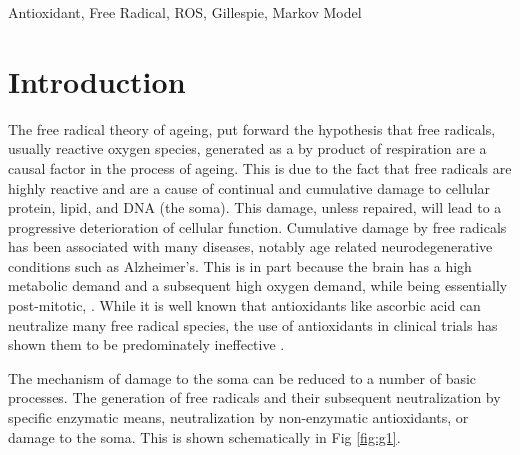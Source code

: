 \documentclass[preprint,12pt,authoryear]{elsarticle}
\begin{document}
\begin{frontmatter}
\begin{abstract}
\end{abstract}

\begin{keyword}
Antioxidant, Free Radical, ROS, Gillespie, Markov Model



\end{keyword}

\end{frontmatter}


\section{Introduction}
\label{}

The free radical theory of ageing, \citet{Harman:1956wu} put forward the hypothesis that
free radicals, usually reactive oxygen species, generated as a by product of respiration are a causal
factor in the process of ageing. This is due to the fact that free radicals are highly reactive
and are a cause of continual and cumulative damage to cellular protein, lipid, and
DNA (the soma). This damage, unless repaired, will lead to a progressive
deterioration of cellular function. Cumulative damage by free radicals has been associated
with many diseases, notably age related neurodegenerative conditions such as
Alzheimer's. This is in part because the brain has a high metabolic demand and a
subsequent high oxygen demand, while being essentially post-mitotic, \citet{Cobley:2018kt}.  
While it is well known that antioxidants like ascorbic acid can neutralize many free radical
species, the use of antioxidants in clinical trials has shown them to be predominately ineffective \citet{Steinhubl:2008el}.  

The mechanism of damage to the soma can be reduced to a number of basic
processes. The generation of free radicals and their subsequent neutralization by specific
enzymatic means, neutralization by non-enzymatic antioxidants, or damage to the
soma. This is shown schematically in Fig \ref{fig:g1}.
\end{document}
